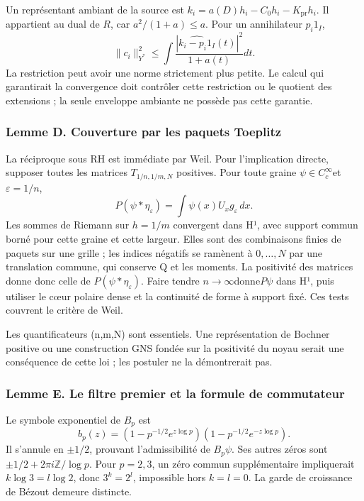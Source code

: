 \documentclass[
  10pt,
  a4paper,
]{article}
\begin{document}
Un représentant ambiant de la source est
\(k_i=a(D)h_i-C_0h_i-K_{\mathrm{pr}}h_i\). Il appartient au dual de
\(R\), car \(a^2/(1+a)\le a\). Pour un annihilateur \(p_i1_I\), \[
\|c_i\|_{Y^*}^2\le
\int\frac{|\widehat{k_i-p_i1_I}(t)|^2}{1+a(t)}dt.
\] La restriction peut avoir une norme strictement plus petite. Le
calcul qui garantirait la convergence doit contrôler cette restriction
ou le quotient des extensions ; la seule enveloppe ambiante ne possède
pas cette garantie.

\hypertarget{lemme-d.-couverture-par-les-paquets-toeplitz}{%
\subsubsection{Lemme D. Couverture par les paquets
Toeplitz}\label{lemme-d.-couverture-par-les-paquets-toeplitz}}

La réciproque sous RH est immédiate par Weil. Pour l'implication
directe, supposer toutes les matrices \(T_{1/n,1/m,N}\) positives. Pour
toute graine \(\psi\in C_c^\infty\)et\(\varepsilon=1/n\), \[
P(\psi*\eta_\varepsilon)=\int\psi(x)U_xg_\varepsilon\,dx.
\] Les sommes de Riemann sur \(h=1/m\) convergent dans H¹, avec support
commun borné pour cette graine et cette largeur. Elles sont des
combinaisons finies de paquets sur une grille ; les indices négatifs se
ramènent à \(0,\ldots,N\) par une translation commune, qui conserve Q et
les moments. La positivité des matrices donne donc celle de
\(P(\psi*\eta_\varepsilon)\). Faire tendre \(n\to\infty\)donne\(P\psi\)
dans H¹, puis utiliser le cœur polaire dense et la continuité de forme à
support fixé. Ces tests couvrent le critère de Weil.

Les quantificateurs (n,m,N) sont essentiels. Une représentation de
Bochner positive ou une construction GNS fondée sur la positivité du
noyau serait une conséquence de cette loi ; les postuler ne la
démontrerait pas.

\hypertarget{lemme-e.-le-filtre-premier-et-la-formule-de-commutateur}{%
\subsubsection{Lemme E. Le filtre premier et la formule de
commutateur}\label{lemme-e.-le-filtre-premier-et-la-formule-de-commutateur}}

Le symbole exponentiel de \(B_p\) est \[
b_p(z)=(1-p^{-1/2}e^{z\log p})(1-p^{-1/2}e^{-z\log p}).
\] Il s'annule en \(\pm1/2\), prouvant l'admissibilité de \(B_p\psi\).
Ses autres zéros sont \(\pm1/2+2\pi i\mathbb Z/\log p\). Pour \(p=2,3\),
un zéro commun supplémentaire impliquerait \(k\log3=l\log2\), donc
\(3^k=2^l\), impossible hors \(k=l=0\). La garde de croissance de Bézout
demeure distincte.
\end{document}
